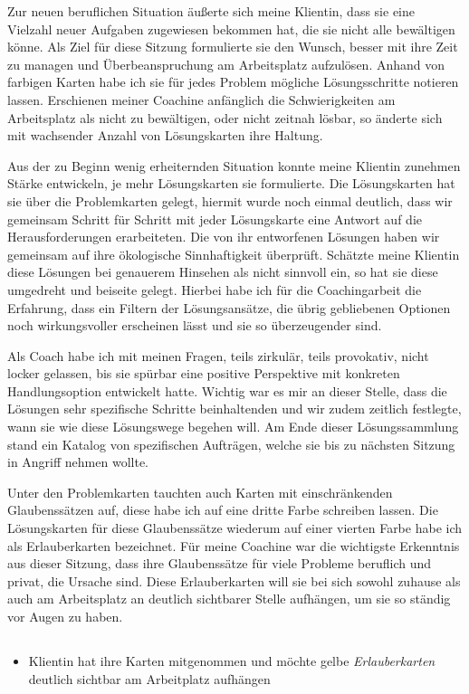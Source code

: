\documentclass[11pt,a4paper]{article}
\begin{document}
Zur neuen beruflichen Situation äußerte sich meine Klientin, dass sie eine Vielzahl neuer Aufgaben zugewiesen bekommen hat, die sie nicht alle bewältigen könne. Als Ziel für diese Sitzung formulierte sie den Wunsch, besser mit ihre Zeit zu managen und Überbeanspruchung am Arbeitsplatz aufzulösen. Anhand von farbigen Karten habe ich sie für jedes Problem mögliche Lösungsschritte notieren lassen. Erschienen meiner Coachine anfänglich die Schwierigkeiten am Arbeitsplatz als nicht zu bewältigen, oder nicht zeitnah lösbar, so änderte sich mit wachsender Anzahl von Lösungskarten ihre Haltung. 

Aus der zu Beginn wenig erheiternden Situation konnte meine Klientin zunehmen Stärke entwickeln, je mehr Lösungskarten sie formulierte. Die Lösungskarten hat sie über die Problemkarten gelegt, hiermit wurde noch einmal deutlich, dass wir gemeinsam Schritt für Schritt mit jeder Lösungskarte eine Antwort auf die Herausforderungen erarbeiteten. Die von ihr entworfenen Lösungen haben wir gemeinsam auf ihre ökologische Sinnhaftigkeit überprüft. Schätzte meine Klientin diese Lösungen bei genauerem Hinsehen als nicht sinnvoll ein, so hat sie diese umgedreht und beiseite gelegt. Hierbei habe ich für die Coachingarbeit die Erfahrung, dass ein Filtern der Lösungsansätze, die übrig gebliebenen Optionen noch wirkungsvoller erscheinen lässt und sie so überzeugender sind.  

Als Coach habe ich mit meinen Fragen, teils zirkulär, teils provokativ, nicht locker gelassen, bis sie spürbar eine positive Perspektive mit konkreten Handlungsoption entwickelt hatte. Wichtig war es mir an dieser Stelle, dass die Lösungen sehr spezifische Schritte beinhaltenden und wir zudem zeitlich festlegte, wann sie wie diese Lösungswege begehen will. 
Am Ende dieser Lösungssammlung stand ein Katalog von spezifischen Aufträgen, welche sie bis zu nächsten Sitzung in Angriff nehmen wollte.

Unter den Problemkarten tauchten auch Karten mit einschränkenden Glaubenssätzen auf, diese habe ich auf eine dritte Farbe schreiben lassen. Die Lösungskarten für diese Glaubenssätze wiederum auf einer vierten Farbe habe ich als Erlauberkarten bezeichnet. Für meine Coachine war die wichtigste Erkenntnis aus dieser Sitzung, dass ihre Glaubenssätze für viele Probleme beruflich und privat, die Ursache sind. Diese Erlauberkarten will sie bei sich sowohl zuhause als auch am Arbeitsplatz an deutlich sichtbarer Stelle aufhängen, um sie so ständig vor Augen zu haben.




\subsection*{\color{Orange}{Vierte Sitzung: Lösungsorientiertes Coaching}}


\begin{itemize}


	
	\item Klientin hat ihre Karten mitgenommen und möchte gelbe \textsl{Erlauberkarten} deutlich sichtbar am Arbeitplatz aufhängen


\end{itemize}
\end{document}
